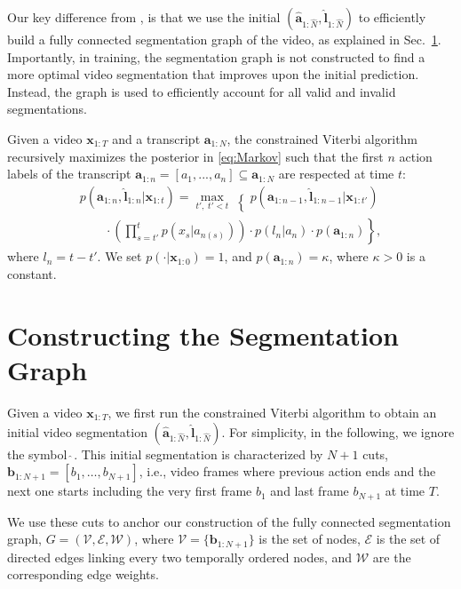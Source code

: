 \documentclass[10pt,twocolumn,letterpaper]{article}
\begin{document}
Our key difference from \cite{richard2018neuralnetwork}, is that we use the initial $(\hat{\bm{a}}_{1:\hat{N}}, \hat{\bm{l}}_{1:\hat{N}})$ to efficiently build a fully connected segmentation graph of the video, as explained in Sec.~\ref{sec:SegmentationGraph}. 
Importantly, in training, the segmentation graph is not constructed to find a more optimal video segmentation that improves upon the initial prediction. Instead, the graph is used to efficiently account for all valid and invalid segmentations. 

Given a video $\bm{x}_{1:T}$ and a transcript $\bm{a}_{1:N}$, the constrained Viterbi algorithm recursively maximizes the posterior in \eqref{eq:Markov} such that the first $n$ action labels of the transcript $\bm{a}_{1:n}=[a_1,...,a_n]\subseteq \bm{a}_{1:N}$ are respected at time $t$:
\begin{equation}
\begin{array}{l}
\displaystyle
  p(\bm{a}_{1:n},\hat{\bm{l}}_{1:n}|\bm{x}_{1:t}) = \left.\max_{t',\; t'<t}\right\{ p(\bm{a}_{1:n-1},\hat{\bm{l}}_{1:n-1}|\bm{x}_{1:t'})\\ \displaystyle \quad \quad   \cdot \left.\left(\prod_{s = t'}^{t} p(x_s|a_{n(s)})\right) \cdot p(l_n|a_n) \cdot p(\bm{a}_{1:n})\right\},
  \end{array}
\label{eq:Viterbi}
\end{equation}
where $l_n = t-t'$. We set $p(\cdot|\bm{x}_{1:0}) = 1$, and $p(\bm{a}_{1:n}) = \kappa$, where $\kappa>0$ is a constant.


\section{Constructing the Segmentation Graph}\label{sec:SegmentationGraph}

Given a video $\bm{x}_{1:T}$, we first run the constrained Viterbi algorithm to obtain an initial video segmentation  $(\hat{\bm{a}}_{1:\hat{N}}, \hat{\bm{l}}_{1:\hat{N}})$. For simplicity, in the following, we ignore the symbol $\hat{~}$. This initial segmentation is characterized by $N+1$ cuts, $\bm{b}_{1:N+1}=[b_1,\dots, b_{N+1}]$, i.e., video frames where previous action ends and the next one starts including the very first frame $b_1$ and last frame $b_{N+1}$ at time $T$. 

We use these cuts to anchor our construction of the fully connected segmentation graph, $G=(\mathcal{V},\mathcal{E},\mathcal{W})$, where $\mathcal{V}=\{\bm{b}_{1:N+1}\}$ is the set of nodes, $\mathcal{E}$ is the set of directed edges linking every two temporally ordered nodes, and $\mathcal{W}$ are the corresponding edge weights. 
\end{document}
